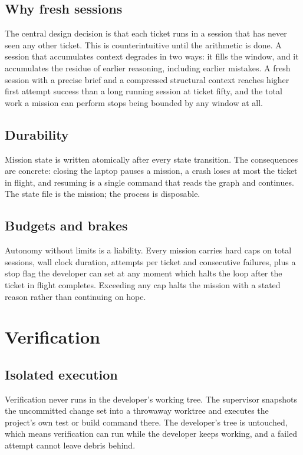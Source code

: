 \subsection{Why fresh sessions}

The central design decision is that each ticket runs in a session that has never seen any
other ticket. This is counterintuitive until the arithmetic is done. A session that
accumulates context degrades in two ways: it fills the window, and it accumulates the
residue of earlier reasoning, including earlier mistakes. A fresh session with a precise
brief and a compressed structural context reaches higher first attempt success than a long
running session at ticket fifty, and the total work a mission can perform stops being bounded
by any window at all.

\subsection{Durability}

Mission state is written atomically after every state transition. The consequences are
concrete: closing the laptop pauses a mission, a crash loses at most the ticket in flight,
and resuming is a single command that reads the graph and continues. The state file is the
mission; the process is disposable.

\subsection{Budgets and brakes}

Autonomy without limits is a liability. Every mission carries hard caps on total sessions,
wall clock duration, attempts per ticket and consecutive failures, plus a stop flag the
developer can set at any moment which halts the loop after the ticket in flight completes.
Exceeding any cap halts the mission with a stated reason rather than continuing on hope.

\section{Verification}

\subsection{Isolated execution}

Verification never runs in the developer's working tree. The supervisor snapshots the
uncommitted change set into a throwaway worktree and executes the project's own test or build
command there. The developer's tree is untouched, which means verification can run while the
developer keeps working, and a failed attempt cannot leave debris behind.

